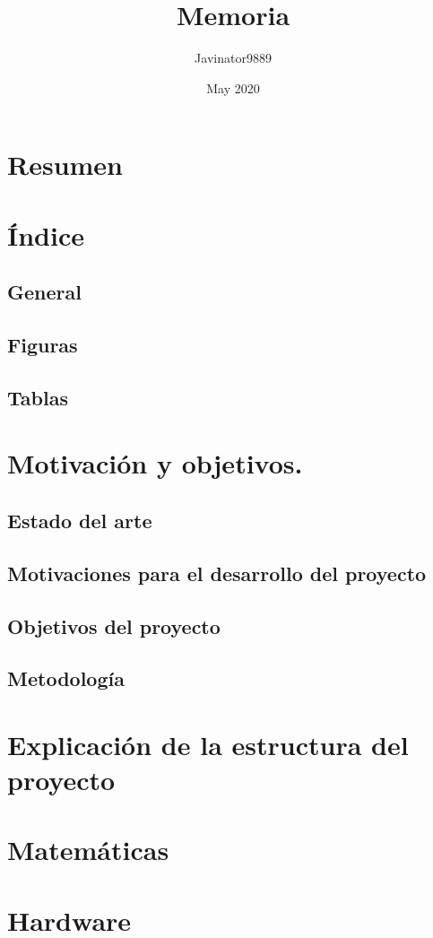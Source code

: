 \documentclass{article}
\title{Memoria}
\author{Javinator9889 }
\date{May 2020}
\begin{document}
\maketitle

\section{Resumen}
\section{Índice}
\subsection{General}
\subsection{Figuras}
\subsection{Tablas}
\section{Motivación y objetivos.}
\subsection{Estado del arte}
\subsection{Motivaciones para el desarrollo del proyecto}
\subsection{Objetivos del proyecto}
\subsection{Metodología}
\section{Explicación de la estructura del proyecto}
\section{Matemáticas}
\section{Hardware}
\end{document}
